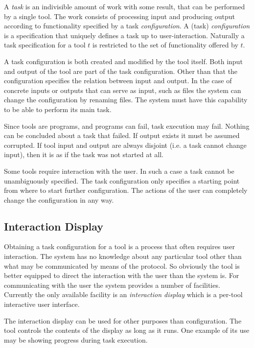 \documentclass{article}
\begin{document}
   A \textit{task} is an indivisible amount of work with some result, that can
   be performed by a single tool. The work consists of processing input and
   producing output according to functionality specified by a task \textit{
   configuration}.  A (task) \textit{configuration} is a specification that
   uniquely defines a task up to user-interaction. Naturally a task
   specification for a tool $t$ is restricted to the set of functionality
   offered by $t$.

   A task configuration is both created and modified by the tool itself. Both
   input and output of the tool are part of the task configuration. Other than
   that the configuration specifies the relation between input and output.  In
   the case of concrete inputs or outputs that can serve as input, such as
   files the system can change the configuration by renaming files. The system
   must have this capability to be able to perform its main task.
 
   Since tools are programs, and programs can fail, task execution may fail.
   Nothing can be concluded about a task that failed. If output exists it must
   be assumed corrupted. If tool input and output are always disjoint (i.e. a
   task cannot change input), then it is as if the task was not started at all.

   Some tools require interaction with the user. In such a case a task cannot
   be unambiguously specified. The task configuration only specifies a starting
   point from where to start further configuration. The actions of the user can
   completely change the configuration in any way.

  \subsection{Interaction Display}

   Obtaining a task configuration for a tool is a process that often requires
   user interaction. The system has no knowledge about any particular tool
   other than what may be communicated by means of the protocol. So obviously
   the tool is better equipped to direct the interaction with the user than the
   system is. For communicating with the user the system provides a number of
   facilities. Currently the only available facility is an \textit{interaction
   display} which is a per-tool interactive user interface.

   The interaction display can be used for other purposes than configuration.
   The tool controls the contents of the display as long as it runs. One
   example of its use may be showing progress during task execution.
\end{document}

